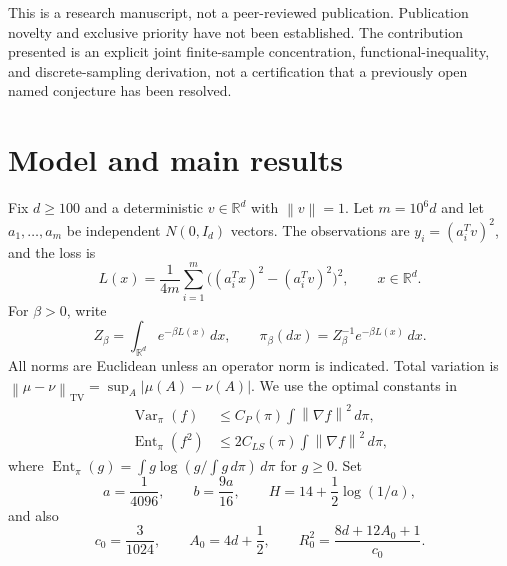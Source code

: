 \documentclass[11pt,letterpaper]{article}
\numberwithin{equation}{section}
\theoremstyle{remark}
\newcommand{\R}{\mathbb R}
\newcommand{\Var}{\operatorname{Var}}
\newcommand{\Ent}{\operatorname{Ent}}
\newcommand{\TV}{\mathrm{TV}}
\newcommand{\1}{\mathbf 1}
\newcommand{\norm}[1]{\left\lVert#1\right\rVert}
\newcommand{\abs}[1]{\left\lvert#1\right\rvert}
\begin{document}
This is a research manuscript, not a peer-reviewed publication. Publication novelty and exclusive priority have not been established. The contribution presented is an explicit joint finite-sample concentration, functional-inequality, and discrete-sampling derivation, not a certification that a previously open named conjecture has been resolved.

\section{Model and main results}\label{sec:results}

Fix $d\ge100$ and a deterministic $v\in\R^d$ with $\norm v=1$. Let $m=10^6d$ and let $a_1,\ldots,a_m$ be independent $N(0,I_d)$ vectors. The observations are $y_i=(a_i^Tv)^2$, and the loss is
\begin{equation}\label{eq:loss}
 L(x)=\frac1{4m}\sum_{i=1}^m\big((a_i^Tx)^2-(a_i^Tv)^2\big)^2,
 \qquad x\in\R^d.
\end{equation}
For $\beta>0$, write
\begin{equation}\label{eq:gibbs}
 Z_\beta=\int_{\R^d}e^{-\beta L(x)}\,dx,
 \qquad \pi_\beta(dx)=Z_\beta^{-1}e^{-\beta L(x)}\,dx.
\end{equation}
All norms are Euclidean unless an operator norm is indicated. Total variation is $\norm{\mu-\nu}_{\TV}=\sup_A\abs{\mu(A)-\nu(A)}$.
We use the optimal constants in
\begin{align}
 \Var_{\pi}(f)&\le C_P(\pi)\int\norm{\nabla f}^2\,d\pi,\label{eq:pi}\\
 \Ent_{\pi}(f^2)&\le2C_{LS}(\pi)\int\norm{\nabla f}^2\,d\pi,\label{eq:lsi}
\end{align}
where $\Ent_\pi(g)=\int g\log(g/\int g\,d\pi)\,d\pi$ for $g\ge0$. Set
\begin{equation}\label{eq:constants}
 a=\frac1{4096},\qquad b=\frac{9a}{16},\qquad
 H=14+\frac12\log(1/a),
\end{equation}
and also
\begin{equation}\label{eq:convconstants}
 c_0=\frac3{1024},\qquad A_0=4d+\frac12,\qquad
 R_0^2=\frac{8d+12A_0+1}{c_0}.
\end{equation}
\end{document}
